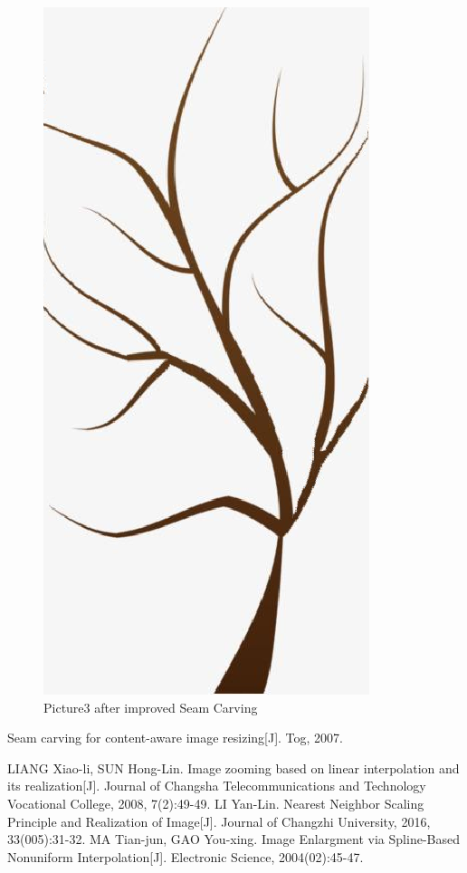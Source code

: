 \documentclass[final]{cvpr}
\begin{document}
\begin{figure}
\begin{center}
    \includegraphics[scale=0.2]{pics/3-4.png}
    \caption{Picture3 after improved Seam Carving}
    \label{pic3-4} 
\end{center}
\end{figure}


\begin{thebibliography}{99}  

Seam carving for content-aware image resizing[J]. Tog, 2007.

LIANG Xiao-li, SUN Hong-Lin. Image zooming based on linear interpolation and its realization[J]. Journal of Changsha Telecommunications and Technology Vocational College, 2008, 7(2):49-49.
LI Yan-Lin. Nearest Neighbor Scaling Principle and Realization of Image[J]. Journal of Changzhi University, 2016, 33(005):31-32.
MA Tian-jun, GAO You-xing. Image Enlargment via Spline-Based Nonuniform Interpolation[J]. Electronic Science, 2004(02):45-47.

\end{thebibliography} 
\end{document}
